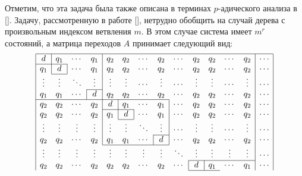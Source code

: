 Отметим, что эта задача была также описана в терминах
$p$-адического анализа в []. Задачу,
рассмотренную в работе [], нетрудно обобщить
на случай дерева с произвольным индексом ветвления $m$. В этом
случае система имеет $m^r$ состояний, а матрица переходов $A$
принимает следующий вид:
\begin{equation}
\begin{array}{|cccccccccccccc|}
\hline
\multicolumn{1}{|c|}{d} & q_1 & \cdots & \multicolumn{1}{c|}{q_1} & q_2 & q_2 & \cdots & q_2 & \cdots & q_2 & q_2 & \cdots & \multicolumn{1}{c|}{q_2} & \cdots\\
\cline{1-2}
q_1 & \multicolumn{1}{|c|}{d} & \cdots & \multicolumn{1}{c|}{q_1} & q_2 & q_2 & \cdots & q_2 & \cdots & q_2 & q_2 & \cdots & \multicolumn{1}{c|}{q_2} & \cdots\\
\cline{2-2}
\vdots & \vdots & \ddots & \multicolumn{1}{c|}{\vdots} & \vdots & \vdots & \cdots & \vdots & \cdots & \vdots & \vdots & \cdots & \multicolumn{1}{c|}{\vdots} & \cdots\\
\cline{4-4}
q_1 & q_1 & \cdots & \multicolumn{1}{|c|}{d} & q_2 & q_2 & \cdots & q_2 & \cdots & q_2 & q_2 & \cdots & \multicolumn{1}{c|}{q_2} & \cdots\\
\cline{1-8}
q_2 & q_2 & \cdots & q_2 & \multicolumn{1}{|c|}{d} & q_1 & \cdots & \multicolumn{1}{c|}{q_1} & \cdots & q_2 & q_2 & \cdots & \multicolumn{1}{c|}{q_2} & \cdots\\
\cline{5-6}
q_2 & q_2 & \cdots & q_2 & \multicolumn{1}{|c|}{q_1} & \multicolumn{1}{c|}{d} & \cdots & \multicolumn{1}{c|}{q_1} & \cdots & q_2 & q_2 &  \cdots &\multicolumn{1}{c|}{q_2} & \cdots\\
\cline{6-6}
\vdots & \vdots & \vdots & \vdots & \multicolumn{1}{|c}{\vdots} & \vdots & \ddots & \multicolumn{1}{c|}{\vdots} & \cdots & \vdots & \vdots & \cdots & \multicolumn{1}{c|}{\vdots} & \cdots\\
\cline{8-8}
q_2 & q_2 & \cdots & q_2 & \multicolumn{1}{|c}{q_1}  & q_1 & \cdots & \multicolumn{1}{|c|}{d} & \cdots & q_2 & q_2 & \cdots & \multicolumn{1}{c|}{q_2} & \cdots\\
\cline{5-8}
\vdots & \vdots & \vdots & \vdots & \vdots & \vdots & \vdots & \vdots & \ddots & \vdots & \vdots & \vdots & \multicolumn{1}{c|}{\vdots} & \cdots\\
\cline{10-13}
q_2 & q_2 & \cdots & q_2 & q_2 & q_2 & \cdots & q_2 & \cdots & \multicolumn{1}{|c|}{d} & q_1 & \cdots & \multicolumn{1}{c|}{q_1} & \cdots\\
\cline{10-11}

\end{array}
\end{equation}

